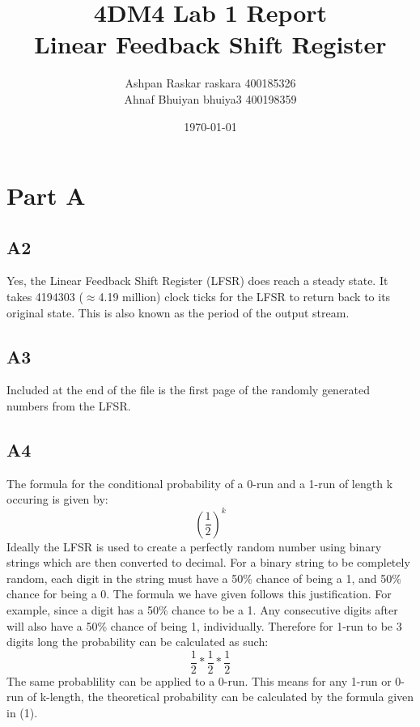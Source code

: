\documentclass[12pt, letterpaper, titlepage, hidelinks]{article}
\title{4DM4 Lab 1 Report \\ Linear Feedback Shift Register}
\author{Ashpan Raskar raskara 400185326\\
		Ahnaf Bhuiyan bhuiya3 400198359}
\date{\today}
\begin{document}
\maketitle
\tableofcontents
\newpage
\setlength{\parindent}{0pt}
\setcounter{secnumdepth}{0}
\section{Part A}
	\subsection{A2}
		Yes, the Linear Feedback Shift Register (LFSR) does reach a steady state. It takes 4194303 ($\approx$4.19 million) clock ticks for the LFSR to return back to its original state. This is also known as the period of the output stream.
	\subsection{A3}
		Included at the end of the file is the first page of the randomly generated numbers from the LFSR\@.
	\subsection{A4}
		The formula for the conditional probability of a 0-run and a 1-run of length k occuring is given by:
		\begin{equation}
			{(\frac{1}{2})}^{k}
		\end{equation}
		Ideally the LFSR is used to create a perfectly random number using binary strings which are then converted to decimal. For a binary string to be completely random, each digit in the string must have a 50\% chance of being a 1, and 50\% chance for being a 0. The formula we have given follows this justification. For example, since a digit has a 50\% chance to be a 1. Any consecutive digits after will also have a 50\% chance of being 1, individually. Therefore for 1-run to be 3 digits long the probability can be calculated as such:
		\begin{equation}
			\frac{1}{2} * \frac{1}{2} * \frac{1}{2}
		\end{equation}
		The same probablility can be applied to a 0-run. This means for any 1-run or 0-run of k-length, the theoretical probability can be calculated by the formula given in (1).
\end{document}
